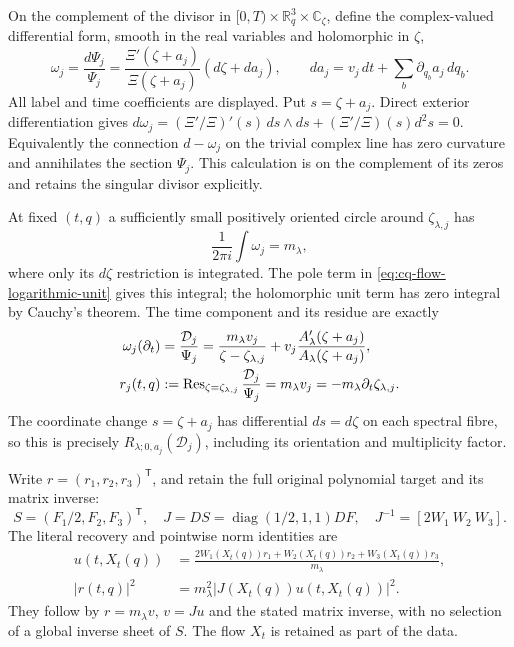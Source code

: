 On the complement of the divisor in
$[0,T)\times\mathbb R^3_q\times\mathbb C_\zeta$, define the
complex-valued differential form, smooth in the real variables and
holomorphic in $\zeta$,
\begin{equation}
 \omega_j=\frac{d\Psi_j}{\Psi_j}
 =\frac{\Xi'(\zeta+a_j)}{\Xi(\zeta+a_j)}
                         (d\zeta+da_j),\qquad
 da_j=v_j\,dt+\sum_b\partial_{q_b}a_j\,dq_b .
 \label{eq:cq-flow-logarithmic-connection}
\end{equation}
All label and time coefficients are displayed. Put $s=\zeta+a_j$.
Direct exterior differentiation gives
$d\omega_j=(\Xi'/\Xi)'(s)\,ds\wedge ds+
(\Xi'/\Xi)(s)d^2s=0$.
Equivalently the connection $d-\omega_j$ on the trivial complex
line has zero curvature and annihilates the section $\Psi_j$.
This calculation is on the complement of its zeros and retains
the singular divisor explicitly.

At fixed $(t,q)$ a sufficiently small positively oriented circle
around $\zeta_{\lambda,j}$ has
\[
 \frac1{2\pi i}\int\omega_j=m_\lambda,
\]
where only its $d\zeta$ restriction is integrated. The pole term in
\eqref{eq:cq-flow-logarithmic-unit} gives this integral; the
holomorphic unit term has zero integral by Cauchy's theorem.
The time component and its residue are exactly
\begin{align}
 \omega_j(\partial_t)
 &=\frac{\mathcal D_j}{\Psi_j}
 =\frac{m_\lambda v_j}{\zeta-\zeta_{\lambda,j}}
       +v_j\frac{A_\lambda'(\zeta+a_j)}
                       {A_\lambda(\zeta+a_j)},\notag\\
 r_j(t,q)
 &:=\operatorname{Res}_{\zeta=\zeta_{\lambda,j}}
                    \frac{\mathcal D_j}{\Psi_j}
 =m_\lambda v_j
 =-m_\lambda\partial_t\zeta_{\lambda,j}.
 \label{eq:cq-flow-temporal-residue}
\end{align}
The coordinate change $s=\zeta+a_j$ has differential $ds=d\zeta$
on each spectral fibre, so this is precisely
$R_{\lambda;0,a_j}(\mathcal D_j)$, including its orientation
and multiplicity factor.

Write $r=(r_1,r_2,r_3)^{\mathsf T}$, and retain the full original
polynomial target and its matrix inverse:
\[
 S=(F_1/2,F_2,F_3)^{\mathsf T},\quad
 J=DS=\operatorname{diag}(1/2,1,1)DF,\quad
 J^{-1}=[2W_1\ W_2\ W_3].
\]
The literal recovery and pointwise norm identities are
\begin{equation}
 \begin{aligned}
 u(t,X_t(q))
 &=\frac{2W_1(X_t(q))r_1+
              W_2(X_t(q))r_2+W_3(X_t(q))r_3}{m_\lambda},\\
 |r(t,q)|^2&=m_\lambda^2|J(X_t(q))u(t,X_t(q))|^2 .
 \end{aligned}
 \label{eq:cq-flow-residue-velocity-recovery}
\end{equation}
They follow by $r=m_\lambda v$, $v=Ju$ and the stated matrix
inverse, with no selection of a global inverse sheet of $S$.
The flow $X_t$ is retained as part of the data.


